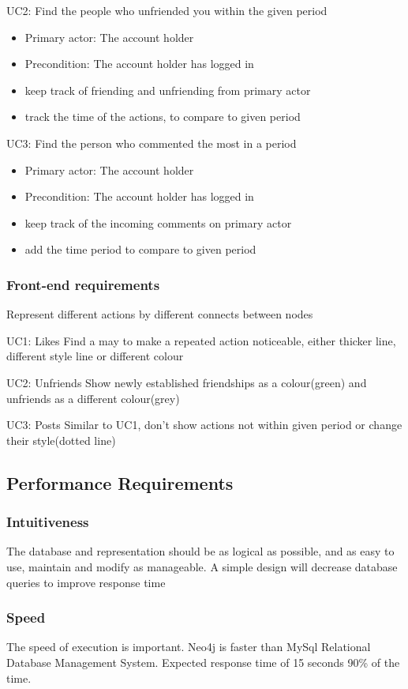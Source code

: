 \documentclass[11pt]{article}
\begin{document}
UC2: Find the people who unfriended you within the given period
\begin{itemize}
\item Primary actor: The account holder
\item Precondition: The account holder has logged in
\item keep track of friending and unfriending from primary actor
\item track the time of the actions, to compare to given period
\end{itemize}

UC3: Find the person who commented the most in a period
\begin{itemize}
\item Primary actor: The account holder
\item Precondition: The account holder has logged in
\item keep track of the incoming comments on primary actor
\item add the time period to compare to given period
\end{itemize}

\subsubsection{Front-end requirements}
Represent different actions by different connects between nodes

UC1: Likes
Find a may to make a repeated action noticeable, either thicker line, different style line or different colour

UC2: Unfriends
Show newly established friendships as a colour(green) and unfriends as a different colour(grey)

UC3: Posts
Similar to UC1, don't show actions not within given period or change their style(dotted line)

\subsection{Performance Requirements}
\subsubsection{Intuitiveness}
The database and representation should be as logical as possible, and as easy to use, maintain and modify as manageable. 
A simple design will decrease database queries to improve response time

\subsubsection{Speed}
The speed of execution is important. Neo4j is faster than MySql Relational Database Management System. Expected response time of 15 seconds 90\% of the time.
\end{document}
